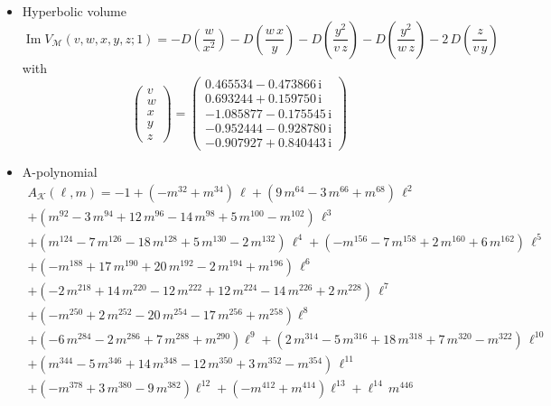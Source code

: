 \documentclass[12pt,reqno]{amsart}
\numberwithin{equation}{section}
\renewcommand{\Im}{\operatorname{Im}}
\newcommand{\I}{\mathrm{i}}
\begin{document}
\begin{itemize}
\item Hyperbolic volume
\begin{equation*}
  \Im V_{\mathcal{M}}(v,w,x,y,z; 1)
  =
  - D\left( \frac{w}{x^2}\right)
  - D\left( \frac{w \, x}{y} \right)
  - D\left( \frac{y^2}{ v \, z}\right)
  - D\left( \frac{y^2}{w \,z} \right)
  - 2 \, D\left( \frac{z}{v \, y}\right)
\end{equation*}
with
\begin{equation*}
  \begin{pmatrix}
    v \\ w\\ x\\ y \\ z
  \end{pmatrix}
  =
  \begin{pmatrix}
    0.465534 - 0.473866 \, \I
    \\
    0.693244 + 0.159750 \, \I
    \\
    -1.085877 - 0.175545 \, \I
    \\
     -0.952444 - 0.928780 \, \I
     \\
     -0.907927 + 0.840443 \, \I
  \end{pmatrix}
\end{equation*}

\item A-polynomial
  \begin{multline*}
    A_\mathcal{K}(\ell,m)
    =
    -1 + 
    \left(-  m^{32} +  m^{34} \right) \, \ell
    +\left(
      9 \,  m^{64} - 3  \,  m^{66} +    m^{68}
    \right) \,  \ell^2
    \\
    + \left(
      m^{92} - 3 \,  m^{94} + 12 \,  m^{96} - 14 \, m^{98}
      + 5 \, m^{100} - 
      m^{102}
    \right) \, \ell^3
    \\
    + \left(
      m^{124} - 7 \,  m^{126} - 18 \,  m^{128} + 5 \,  m^{130 }
      - 2 \,  m^{132}
    \right) \, \ell^4
    + \left(
      -  m^{156} - 7 \,  m^{158} + 2  \, m^{160} + 6 \,   m^{162}
    \right)
    \, \ell^5
    \\
    +\left(
      -  m^{188} + 17 \,  m^{190} + 20 \,  m^{192} - 2 \, m^{194} +
      m^{196}
    \right)
    \, \ell^6
    \\
    + \left(
      - 2 \,  m^{218} + 14 \, m^{220} - 12 \,  m^{222} + 12 \,  m^{224}
      - 14 \,    m^{226} + 2 \, m^{228}
    \right) \, \ell^7
    \\
    + \left(
      -  m^{250} + 2 \,  m^{252} - 20 \, m^{254} - 17 \, m^{256} +
      m^{258}
    \right) \ell^8
    \\
    +\left(
      - 6 \,  m^{284} - 2 \, m^{286} + 7 \, m^{288} +  m^{290}
    \right) \ell^9
    + \left(
      2  \, m^{314} - 5 \, m^{316} + 18 \, m^{318}
      + 7 \, m^{320} -  m^{322}
    \right)
    \, \ell^{10}
    \\
    + 
    \left(
      m^{344} - 5 \,  m^{346} + 14 \, m^{348} - 12 \,  m^{350} + 3  \, m^{352}
      - m^{354}
    \right) \, \ell^{11}
    \\
    + \left(
      -  m^{378} + 3  \,  m^{380} - 9  \, m^{382}
    \right) \ell^{12}
    + \left(
      -  m^{412} +  m^{414}
    \right) \ell^{13}
    + \ell^{14} \,  m^{446}
  \end{multline*}
\end{itemize}
\end{document}
